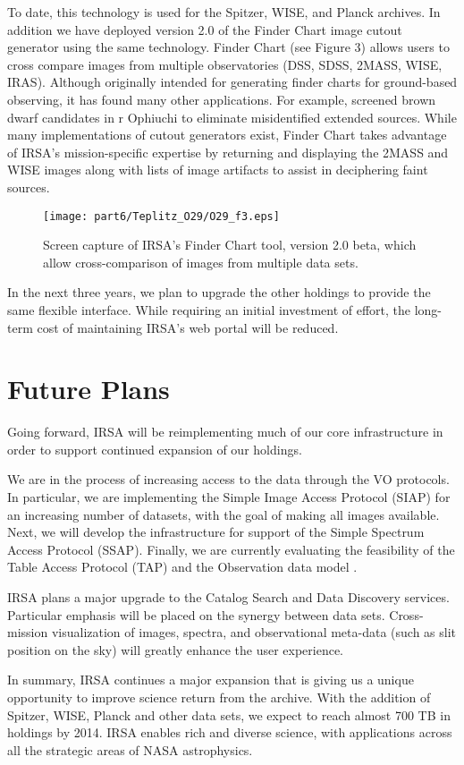 To date, this technology is used for the Spitzer, WISE, and Planck archives. In addition we have deployed version 2.0 of the Finder Chart image cutout generator using the same technology.  Finder Chart (see Figure 3) allows users to cross compare images from multiple observatories (DSS, SDSS, 2MASS, WISE, IRAS). Although originally intended for generating finder charts for ground-based observing, it has found many other applications. For example, \citet{mathews07} screened brown dwarf candidates in r Ophiuchi to eliminate misidentified extended sources. While many implementations of cutout generators exist, Finder Chart takes advantage of IRSA’s mission-specific expertise by returning and displaying the 2MASS and WISE images along with lists of image artifacts to assist in deciphering faint sources.

\begin{figure}[t]

\centering
\texttt{[image: part6/Teplitz\_O29/O29\_f3.eps]}
\caption{Screen capture of IRSA's Finder Chart tool, version 2.0 beta, which allow cross-comparison of images from multiple data sets.}

\end{figure}


In the next three years, we plan to upgrade the other holdings to provide the same flexible interface. While requiring an initial investment of effort, the long-term cost of maintaining IRSA’s web portal will be reduced.

\section{Future Plans}

Going forward, IRSA will be reimplementing much of our core infrastructure in order to support continued expansion of our holdings.  

We are in the process of increasing access to the data through the VO protocols.  In particular, we are implementing the Simple Image Access Protocol (SIAP) for an increasing number of datasets, with the goal of making all images available.  Next, we will develop the infrastructure for support of the Simple Spectrum Access Protocol (SSAP). Finally, we are currently evaluating the feasibility of the Table Access Protocol (TAP) and the Observation data model \citet{louys11}.

IRSA plans a major upgrade to the Catalog Search and Data Discovery services.  Particular emphasis will be placed on the synergy between data sets. Cross-mission visualization of images, spectra, and observational meta-data (such as slit position on the sky) will greatly enhance the user experience.

In summary, IRSA continues a major expansion that is giving us a unique opportunity to improve science return from the archive.  With the addition of Spitzer, WISE, Planck and other data sets, we expect to reach almost 700 TB in holdings by 2014.  IRSA enables rich and diverse science, with applications across all the strategic areas of NASA astrophysics.  


